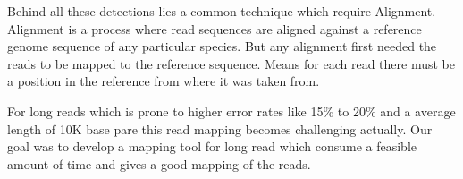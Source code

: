 \documentclass{standalone}
\begin{document}
\bigskip
\noindent
	Behind all these detections lies a common technique which require Alignment. Alignment is a process where read sequences are aligned against a reference genome sequence of any particular species. But any alignment first needed the reads to be mapped to the reference sequence. Means for each read there must be a position in the reference from where it was taken from.
	\par
	For long reads which is prone to higher error rates like 15\% to 20\% and a average length of 10K base pare this read mapping becomes challenging actually. Our goal was to develop a mapping tool for long read which consume a feasible amount of time and gives a good mapping of the reads. 
		  
\end{document}
